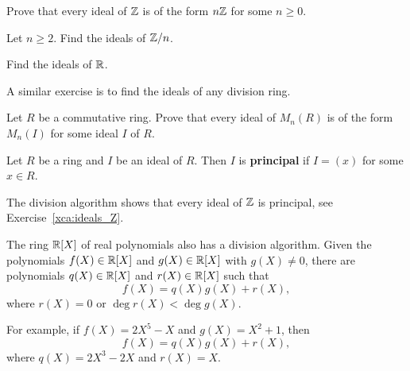 \begin{exercise}
\label{xca:ideals_Z}
Prove that every ideal of $\mathbb{Z}$ is of the form $n\mathbb{Z}$ for some $n\geq0$. 	
\end{exercise}

\begin{exercise}
Let $n\geq2$. Find the ideals of $\mathbb{Z}/n$. 	
\end{exercise}

\begin{exercise}
Find the ideals of $\mathbb{R}$.	
\end{exercise}

A similar exercise is to find the ideals of any division ring.  

\begin{exercise}
\label{xca:ideals}
    Let $R$ be a commutative ring. Prove that every ideal of $M_n(R)$ is 
    of the form $M_n(I)$ for some ideal $I$ of $R$. 
\end{exercise}

%    
%    


\begin{definition}
Let $R$ be a ring and $I$ be an ideal of $R$. Then $I$ is \textbf{principal}
if $I=(x)$ for some $x\in R$. 	
\end{definition}

The division algorithm shows that every ideal of $\mathbb{Z}$ is principal, 
see Exercise~\ref{xca:ideals_Z}.  

The ring $\mathbb{R}[X]$ of real polynomials also has a division algorithm. Given the polynomials 
$f(X)\in\mathbb{R}[X]$ and $g(X)\in\mathbb{R}[X]$ with $g(X)\ne 0$, there are  
polynomials $q(X)\in\mathbb{R}[X]$ and $r(X)\in\mathbb{R}[X]$ such that 
\[
f(X)=q(X)g(X)+r(X),
\]
where $r(X)=0$ or $\deg r(X)<\deg g(X)$. 

For example, 
if $f(X)=2X^5-X$ and $g(X)=X^2+1$, then 
\[
f(X)=q(X)g(X)+r(X),
\]
where $q(X)=2X^3-2X$ and $r(X)=X$. 

